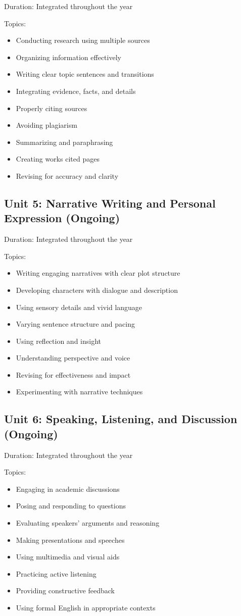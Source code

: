 \documentclass[11pt,letterpaper]{report}
\begin{document}
Duration: Integrated throughout the year

Topics:
\begin{itemize}
\item Conducting research using multiple sources
\item Organizing information effectively
\item Writing clear topic sentences and transitions
\item Integrating evidence, facts, and details
\item Properly citing sources
\item Avoiding plagiarism
\item Summarizing and paraphrasing
\item Creating works cited pages
\item Revising for accuracy and clarity
\end{itemize}

\subsection{Unit 5: Narrative Writing and Personal Expression (Ongoing)}

Duration: Integrated throughout the year

Topics:
\begin{itemize}
\item Writing engaging narratives with clear plot structure
\item Developing characters with dialogue and description
\item Using sensory details and vivid language
\item Varying sentence structure and pacing
\item Using reflection and insight
\item Understanding perspective and voice
\item Revising for effectiveness and impact
\item Experimenting with narrative techniques
\end{itemize}

\subsection{Unit 6: Speaking, Listening, and Discussion (Ongoing)}

Duration: Integrated throughout the year

Topics:
\begin{itemize}
\item Engaging in academic discussions
\item Posing and responding to questions
\item Evaluating speakers' arguments and reasoning
\item Making presentations and speeches
\item Using multimedia and visual aids
\item Practicing active listening
\item Providing constructive feedback
\item Using formal English in appropriate contexts
\end{itemize}
\end{document}
